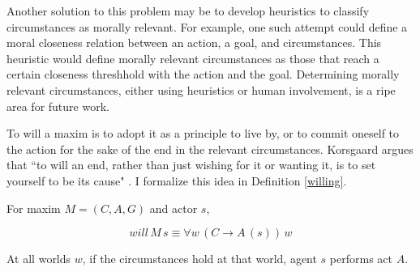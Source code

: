 \begin{isabellebody}
\begin{isamarkuptext}
Another solution to this problem may be to develop heuristics to classify circumstances as morally 
relevant. For example, one such attempt could define a moral closeness relation between an action, a 
goal, and circumstances. This heuristic would define morally relevant circumstances as those that 
reach a certain closeness threshhold with the action and the goal. Determining morally relevant
circumstances, either using heuristics or human involvement, is a ripe area for future work.
\color{black}

To will a maxim is to adopt it as a principle to live by, or to commit oneself to the action for the 
sake of the end in the relevant circumstances. Korsgaard argues that ``to will an end, rather than 
just wishing for it or wanting it, is to set yourself to be its cause" \cite[38]{sources}. I formalize
this idea in Definition \ref{willing}.

\begin{definition}[Willing]\label{willing}
For maxim $M = (C, A, G)$ and actor $s$,

$$will \, M \, s \equiv \forall w \, (C \longrightarrow A \, (s)) \, w$$

At all worlds $w$, if the circumstances hold at that world, agent $s$ performs act $A$.

\end{definition}


\end{isamarkuptext}
\end{isabellebody}
